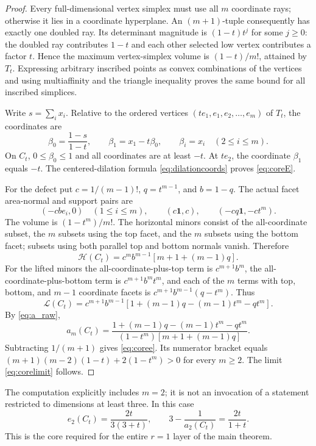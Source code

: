 \begin{proof}
Every full-dimensional vertex simplex must use all $m$ coordinate rays;
otherwise it lies in a coordinate hyperplane. An $(m+1)$-tuple consequently
has exactly one doubled ray. Its determinant magnitude is
$(1-t)t^j$ for some $j\ge0$: the doubled ray contributes $1-t$ and each
other selected low vertex contributes a factor $t$. Hence the maximum
vertex-simplex volume is $(1-t)/m!$, attained by $T_t$. Expressing arbitrary
inscribed points as convex combinations of the vertices and using
multiaffinity and the triangle inequality proves the same bound for all
inscribed simplices.

Write $s=\sum_i x_i$. Relative to the ordered vertices
$(te_1,e_1,e_2,\ldots,e_m)$ of $T_t$, the coordinates are
\[
 \beta_0=\frac{1-s}{1-t},\qquad
 \beta_1=x_1-t\beta_0,\qquad \beta_i=x_i\quad(2\le i\le m).
\]
On $C_t$, $0\le\beta_0\le1$ and all coordinates are at least $-t$.
At $te_2$, the coordinate $\beta_1$ equals $-t$. The centered-dilation
formula \eqref{eq:dilationcoords} proves \eqref{eq:coreE}.

For the defect put $c=1/(m-1)!$, $q=t^{m-1}$, and $b=1-q$.
The actual facet area-normal and support pairs are
\[
 (-cb e_i,0)\quad(1\le i\le m),\qquad
 (c\mathbf1,c),\qquad(-cq\mathbf1,-ct^m).
\]
The volume is $(1-t^m)/m!$. The horizontal minors consist of the
all-coordinate subset, the $m$ subsets using the top facet, and the $m$
subsets using the bottom facet; subsets using both parallel top and bottom
normals vanish. Therefore
\begin{equation}\label{eq:coreH}
 \mathcal H(C_t)=c^m b^{m-1}[m+1+(m-1)q].
\end{equation}
For the lifted minors the all-coordinate-plus-top term is $c^{m+1}b^m$,
the all-coordinate-plus-bottom term is $c^{m+1}b^m t^m$, and each of the
$m$ terms with top, bottom, and $m-1$ coordinate facets is
$c^{m+1}b^{m-1}(q-t^m)$. Thus
\begin{equation}\label{eq:coreL}
 \mathcal L(C_t)=c^{m+1}b^{m-1}
       [1+(m-1)q-(m-1)t^m-qt^m].
\end{equation}
By \eqref{eq:a_raw},
\[
 a_m(C_t)=
 \frac{1+(m-1)q-(m-1)t^m-qt^m}
 {(1-t^m)[m+1+(m-1)q]}.
\]
Subtracting $1/(m+1)$ gives \eqref{eq:coree}. Its numerator bracket equals
$(m+1)(m-2)(1-t)+2(1-t^m)>0$ for every $m\ge2$.
The limit \eqref{eq:corelimit} follows.
\end{proof}

\begin{remark}
The computation explicitly includes $m=2$; it is not an invocation of a
statement restricted to dimensions at least three. In this case
\begin{equation}\label{eq:twoD}
 e_2(C_t)=\frac{2t}{3(3+t)},\qquad
 3-\frac1{a_2(C_t)}=\frac{2t}{1+t}.
\end{equation}
This is the core required for the entire $r=1$ layer of the main theorem.
\end{remark}

